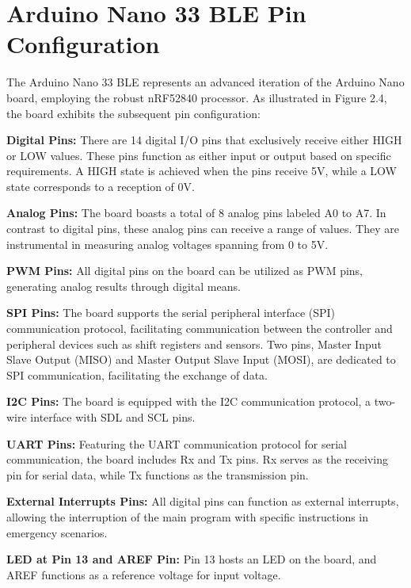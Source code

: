  \section{Arduino Nano 33 BLE Pin Configuration}
 
 The Arduino Nano 33 BLE represents an advanced iteration of the Arduino Nano board, employing the robust nRF52840 processor. As illustrated in Figure 2.4, the board exhibits the subsequent pin configuration:
 
 \textbf{Digital Pins:} There are 14 digital I/O pins that exclusively receive either HIGH or LOW values. These pins function as either input or output based on specific requirements. A HIGH state is achieved when the pins receive 5V, while a LOW state corresponds to a reception of 0V.
 
 \textbf{Analog Pins:} The board boasts a total of 8 analog pins labeled A0 to A7. In contrast to digital pins, these analog pins can receive a range of values. They are instrumental in measuring analog voltages spanning from 0 to 5V.
 
\textbf{ PWM Pins:} All digital pins on the board can be utilized as PWM pins, generating analog results through digital means.
 
 \textbf{SPI Pins:} The board supports the serial peripheral interface (SPI) communication protocol, facilitating communication between the controller and peripheral devices such as shift registers and sensors. Two pins, Master Input Slave Output (MISO) and Master Output Slave Input (MOSI), are dedicated to SPI communication, facilitating the exchange of data.
 
 \textbf{I2C Pins:} The board is equipped with the I2C communication protocol, a two-wire interface with SDL and SCL pins.
 
\textbf{ UART Pins:} Featuring the UART communication protocol for serial communication, the board includes Rx and Tx pins. Rx serves as the receiving pin for serial data, while Tx functions as the transmission pin.
 
\textbf{ External Interrupts Pins:} All digital pins can function as external interrupts, allowing the interruption of the main program with specific instructions in emergency scenarios.
 
\textbf{ LED at Pin 13 and AREF Pin:} Pin 13 hosts an LED on the board, and AREF functions as a reference voltage for input voltage.

